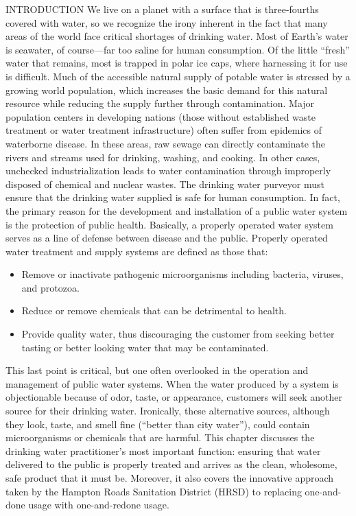 INTRODUCTION
We live on a planet with a surface that is three-fourths covered with water, so we recognize the irony inherent in the fact that many areas of the world face critical shortages of drinking water. Most of Earth’s water is seawater, of course—far too saline for human consumption. Of the little “fresh” water that remains, most is trapped in polar ice caps, where harnessing it for use is difficult. Much of the accessible natural supply of potable water is stressed by a growing world population, which increases the basic demand for this natural resource while reducing
the supply further through contamination. Major population centers in developing nations (those without established waste treatment or water treatment infrastructure) often suffer from epidemics of waterborne disease. In these areas, raw sewage can directly contaminate the rivers and streams used for drinking, washing, and cooking. In other cases, unchecked industrialization leads to water contamination through improperly disposed of chemical and nuclear wastes. The drinking water purveyor must ensure that the drinking water supplied is safe for human consumption. In fact, the primary reason for the development and installation of a public water system is the protection of public health. Basically, a properly operated water system serves as a line of defense between disease and the public. Properly operated water treatment and supply systems are defined as those that:\\
\begin{itemize}
\item Remove or inactivate pathogenic microorganisms including bacteria, viruses, and protozoa.
\item Reduce or remove chemicals that can be detrimental to health.
\item Provide quality water, thus discouraging the customer from seeking better tasting or better looking water that may be contaminated.
\end{itemize}
This last point is critical, but one often overlooked in the operation and management of public water systems. When the water produced by a system is objectionable because of odor, taste, or appearance, customers will seek another source for their drinking water. Ironically, these alternative sources, although they look, taste, and smell fine (“better than city water”), could contain microorganisms or chemicals that are harmful. This chapter discusses the drinking water practitioner’s most important function: ensuring that water delivered to the public is properly treated and arrives as the clean, wholesome, safe product that it must be. Moreover, it also covers the innovative approach taken by the Hampton Roads Sanitation District (HRSD) to replacing one-and-done usage with one-and-redone usage.\\


